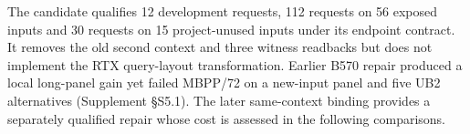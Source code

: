 The candidate qualifies 12 development requests, 112 requests on 56 exposed inputs and 30 requests on 15 project-unused inputs under its endpoint contract. It removes the old second context and three witness readbacks but does not implement the RTX query-layout transformation. Earlier B570 repair produced a local long-panel gain yet failed MBPP/72 on a new-input panel and five UB2 alternatives (Supplement \S S5.1). The later same-context binding provides a separately qualified repair whose cost is assessed in the following comparisons.
